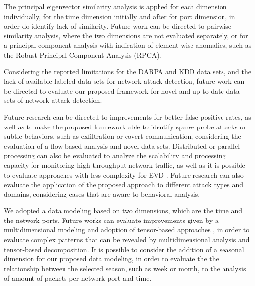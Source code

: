 The principal eigenvector similarity analysis is applied for each dimension individually, for the time dimension initially and after for port dimension, in order do identify lack of similarity. Future work can be directed to pairwise similarity analysis, where the two dimensions are not evaluated separately, or for a principal component analysis with indication of element-wise anomalies, such as the Robust Principal Component Analysis (RPCA).

Considering the reported limitations for the DARPA and KDD data sets, and the lack of available labeled data sets for network attack detection, future work can be directed to evaluate our proposed framework for novel and up-to-date data sets of network attack detection.

Future research can be directed to improvements for better false positive rates, as well as to make the proposed framework able to identify sparse probe attacks or subtle behaviors, such as exfiltration or covert communication, considering the evaluation of a flow-based analysis and novel data sets. Distributed or parallel processing can also be evaluated to analyze the scalability and processing capacity for monitoring high throughput network traffic, as well as it is possible to evaluate approaches with less complexity for EVD \cite{halko2011finding}. Future research can also evaluate the application of the proposed approach to different attack types and domains, considering cases that are aware to behavioral analysis.

We adopted a data modeling based on two dimensions, which are the time and the network ports. Future works can evaluate improvements given by a multidimensional modeling and adoption of tensor-based approaches \cite{da2008robust, gomes2019tensor}, in order to evaluate complex patterns that can be revealed by multidimensional analysis and tensor-based decomposition. It is possible to consider the addition of a seasonal dimension for our proposed data modeling, in order to evaluate the the relationship between the selected season, such as week or month, to the analysis of amount of packets per network port and time.
